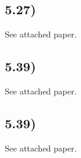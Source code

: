 \documentclass[12pt]{article}
\begin{document}
\subsection*{5.27)}
See attached paper.

\subsection*{5.39)}
See attached paper.

\subsection*{5.39)}
See attached paper.



  
\end{document}
